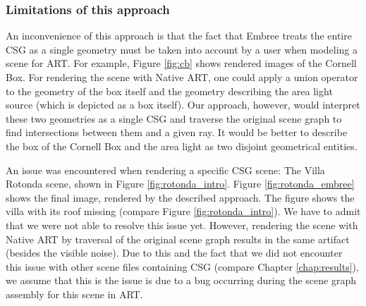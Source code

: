 \subsubsection{Limitations of this approach}

An inconvenience of this approach is that the fact that Embree treats the entire CSG as a single geometry must be taken into account by a user when modeling a scene for ART. For example, Figure \ref{fig:cb} shows rendered images of the Cornell Box. For rendering the scene with Native ART, one could apply a union operator to the geometry of the box itself and the geometry describing the area light source (which is depicted as a box itself). Our approach, however, would interpret these two geometries as a single CSG and traverse the original scene graph to find intersections between them and a given ray. It would be better to describe the box of the Cornell Box and the area light as two disjoint geometrical entities.


An issue was encountered when rendering a specific CSG scene: The Villa Rotonda scene, shown in Figure \ref{fig:rotonda_intro}. Figure \ref{fig:rotonda_embree} shows the final image, rendered by the described approach. The figure shows the villa with its roof missing (compare Figure \ref{fig:rotonda_intro}). We have to admit that we were not able to resolve this issue yet. However, rendering the scene with Native ART by traversal of the original scene graph results in the same artifact (besides the visible noise). Due to this and the fact that we did not encounter this issue with other scene files containing CSG (compare Chapter \ref{chap:results}), we assume that this is the issue is due to a bug occurring during the scene graph assembly for this scene in ART.

